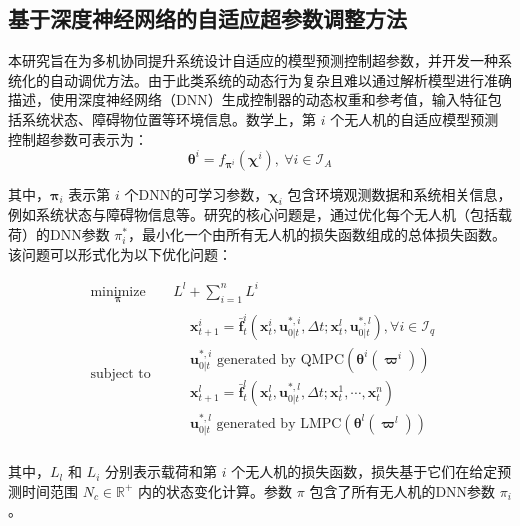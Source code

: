 \documentclass[lang=chs, degree=master, blindreview=false, winfonts=true]{yanputhesis}
\begin{document}
\subsection{基于深度神经网络的自适应超参数调整方法}



本研究旨在为多机协同提升系统设计自适应的模型预测控制超参数，并开发一种系统化的自动调优方法。由于此类系统的动态行为复杂且难以通过解析模型进行准确描述，使用深度神经网络（DNN）生成控制器的动态权重和参考值，输入特征包括系统状态、障碍物位置等环境信息。数学上，第 \(i\) 个无人机的自适应模型预测控制超参数可表示为：
\begin{equation}
	\label{4-7}
    \boldsymbol{\theta}^i=f_{\boldsymbol{\pi}^i}\left(\boldsymbol{\chi}^i\right),\mathrm{~}\forall i\in\mathcal{I}_A
\end{equation}


其中，\( \bm \pi_i \) 表示第 \(i\) 个DNN的可学习参数，\( \bm \chi_i \) 包含环境观测数据和系统相关信息，例如系统状态与障碍物信息等。研究的核心问题是，通过优化每个无人机（包括载荷）的DNN参数 \( \pi_i^* \)，最小化一个由所有无人机的损失函数组成的总体损失函数。该问题可以形式化为以下优化问题：

\begin{equation}
	\label{4-8}
	\begin{aligned} 
	&\operatorname*{minimize}_{\bm{\pi}}& & L^l+\sum_{i=1}^nL^i  \\
	&\text{subject to}& & \begin{aligned}
		&\boldsymbol{x}_{t+1}^i=\bar{\boldsymbol{f}}_t^i\left(\boldsymbol{x}_t^i,\boldsymbol{u}_{0|t}^{*,i},\Delta t;\boldsymbol{x}_t^l,\boldsymbol{u}_{0|t}^{*,l}\right),\forall i\in\mathcal{I}_q\\&\boldsymbol{u}_{0|t}^{*,i}\text{ generated by QMPC}\left(\boldsymbol{\theta}^i\left(\boldsymbol{\varpi}^i\right)\right)\\&\boldsymbol{x}_{t+1}^l=\bar{\boldsymbol{f}}_t^l\left(\boldsymbol{x}_t^l,\boldsymbol{u}_{0|t}^{*,l},\Delta t;\boldsymbol{x}_t^1,\cdots,\boldsymbol{x}_t^n\right)\\&\boldsymbol{u}_{0|t}^{*,l}\text{ generated by LMPC}\left(\boldsymbol{\theta}^l\left(\boldsymbol{\varpi}^l\right)\right)
	\end{aligned} \\
\end{aligned}
\end{equation}


其中，\( {L}_l \) 和 \( {L}_i \) 分别表示载荷和第 \(i\) 个无人机的损失函数，损失基于它们在给定预测时间范围 \( N_c \in \mathbb{R}^+ \) 内的状态变化计算。参数 \( \pi \) 包含了所有无人机的DNN参数 \( \pi_i \)。
\end{document}

